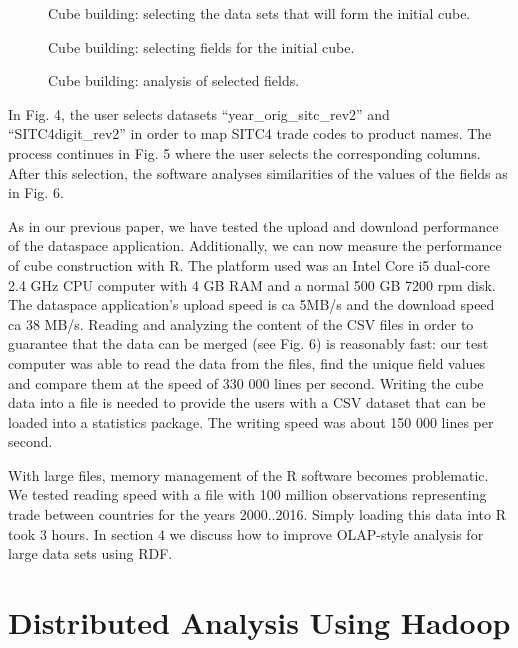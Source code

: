 \documentclass[USenglish,twocolumn]{article}
\begin{document}
\begin{figure}
\caption{Cube building: selecting the data sets that will form the initial cube.\label{fig4}}
\end{figure}

\begin{figure}
\caption{Cube building: selecting fields for the initial cube.\label{fig5}}
\end{figure}

\begin{figure}
\caption{Cube building: analysis of selected fields.\label{fig6}}
\end{figure}

In Fig. 4, the user selects datasets ``year\_orig\_sitc\_rev2'' and
``SITC4digit\_rev2'' in order to map SITC4 trade codes to product names.
The process continues in Fig. 5 where the user selects the corresponding
columns. After this selection, the software analyses similarities of the
values of the fields as in Fig. 6.

As in our previous paper, we have tested the upload and download
performance of the dataspace application. Additionally, we can now
measure the performance of cube construction with R. The platform used
was an Intel Core i5 dual-core 2.4 GHz CPU computer with 4 GB RAM and a
normal 500 GB 7200 rpm disk. The dataspace application's upload speed is
ca 5MB/s and the download speed ca 38 MB/s. Reading and analyzing the
content of the CSV files in order to guarantee that the data can be
merged (see Fig. 6) is reasonably fast: our test computer was able to
read the data from the files, find the unique field values and compare
them at the speed of 330 000 lines per second. Writing the cube data
into a file is needed to provide the users with a CSV dataset that can
be loaded into a statistics package. The writing speed was about 150 000
lines per second.

With large files, memory management of the R software becomes
problematic. We tested reading speed with a file with 100 million
observations representing trade between countries for the years
2000..2016. Simply loading this data into R took 3 hours. In section 4
we discuss how to improve OLAP-style analysis for large data sets using
RDF.


\section{Distributed Analysis Using Hadoop}
\end{document}
